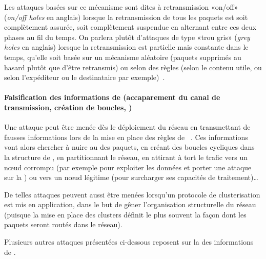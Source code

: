 Les attaques basées sur ce mécanisme sont dites à retransmission «on/off» (\textit{on/off holes} en anglais) lorsque la retransmission de tous les paquets est soit complètement assurée, soit complètement suspendue en alternant entre ces deux phases au fil du temps.
On parlera plutôt d'attaques de type «trou gris» (\textit{grey holes} en anglais) lorsque la retransmission est partielle mais constante dans le temps, qu'elle soit basée sur un mécanisme aléatoire (paquets supprimés au hasard plutôt que d'être retransmis) ou selon des règles (selon le contenu utile, ou selon l'expéditeur ou le destinataire par exemple)~\cite{ZTLMK13}.

        \paragraph{Falsification des informations de  (accaparement du canal de transmission, création de boucles, \etc)}
Une attaque peut être menée dès le déploiement du réseau en transmettant de fausses informations lors de la mise en place des règles de ~\cite{AD14}.
Ces informations vont alors chercher à nuire au  des paquets, en créant des boucles cycliques dans la structure de , en partitionnant le réseau, en attirant à tort le trafic vers un nœud corrompu (par exemple pour exploiter les données et porter une attaque sur la ) ou vers un nœud légitime (pour surcharger ses capacités de traitement)\dots

De telles attaques peuvent aussi être menées lorsqu'un protocole de clusterisation est mis en application, dans le but de gêner l'organisation structurelle du réseau (puisque la mise en place des clusters définit le plus souvent la façon dont les paquets seront routés dans le réseau).

Plusieurs autres attaques présentées ci-dessous reposent sur la  des informations de .

